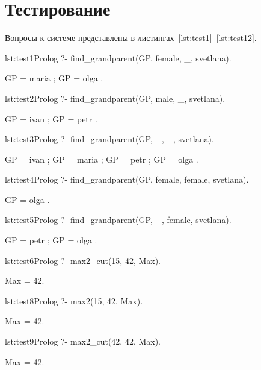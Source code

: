 \section{Тестирование}
Вопросы к системе представлены в листингах~\ref{lst:test1}--\ref{lst:test12}.

\begin{listing}{lst:test1}{Prolog}
?- find_grandparent(GP, female, _, svetlana).

GP = maria ;
GP = olga .
\end{listing}

\begin{listing}{lst:test2}{Prolog}
?- find_grandparent(GP, male, _, svetlana).

GP = ivan ;
GP = petr .
\end{listing}

\begin{listing}{lst:test3}{Prolog}
?- find_grandparent(GP, _, _, svetlana).

GP = ivan ;
GP = maria ;
GP = petr ;
GP = olga .
\end{listing}

\begin{listing}{lst:test4}{Prolog}
?- find_grandparent(GP, female, female, svetlana).

GP = olga .
\end{listing}

\begin{listing}{lst:test5}{Prolog}
?- find_grandparent(GP, _, female, svetlana).

GP = petr ;
GP = olga .
\end{listing}

\begin{listing}{lst:test6}{Prolog}
?- max2_cut(15, 42, Max).

Max = 42.
\end{listing}

\begin{listing}{lst:test8}{Prolog}
?- max2(15, 42, Max).

Max = 42.
\end{listing}

\begin{listing}{lst:test9}{Prolog}
?- max2_cut(42, 42, Max).

Max = 42.
\end{listing}

